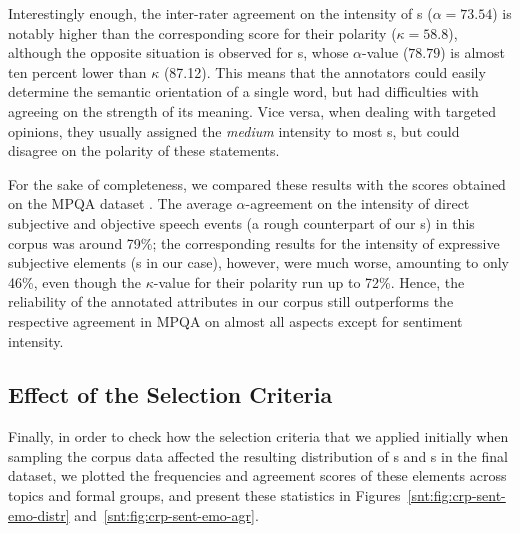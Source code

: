 Interestingly enough, the inter-rater agreement on the intensity of
s ($\alpha = 73.54$) is notably higher than the
corresponding score for their polarity ($\kappa = 58.8$), although the
opposite situation is observed for s, whose
$\alpha$-value ($78.79$) is almost ten percent lower than $\kappa$
(87.12).  This means that the annotators could easily determine the
semantic orientation of a single word, but had difficulties with
agreeing on the strength of its meaning.  Vice versa, when dealing
with targeted opinions, they usually assigned the \emph{medium}
intensity to most s, but could disagree on the
polarity of these statements.

For the sake of completeness, we compared these results with the
scores obtained on the MPQA dataset \cite[see][pp. 38, 80]{Wilson:07}.
The average $\alpha$-agreement on the intensity of direct subjective
and objective speech events (a rough counterpart of our
s) in this corpus was around 79\%; the
corresponding results for the intensity of expressive subjective
elements (s in our case), however, were much
worse, amounting to only 46\%, even though the $\kappa$-value for
their polarity run up to 72\%.  Hence, the reliability of the
annotated attributes in our corpus still outperforms the respective
agreement in MPQA on almost all aspects except for sentiment
intensity.


\subsection{Effect of the Selection Criteria}\label{subsec:eval-selection-criteria}

Finally, in order to check how the selection criteria that we applied
initially when sampling the corpus data affected the resulting
distribution of s and s in
the final dataset, we plotted the frequencies and agreement scores of
these elements across topics and formal groups, and present these
statistics in Figures~\ref{snt:fig:crp-sent-emo-distr}
and~\ref{snt:fig:crp-sent-emo-agr}.


